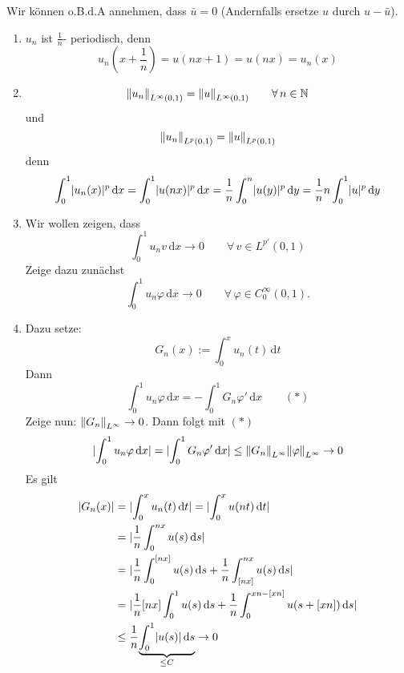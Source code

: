 \begin{beweis}[Für $p >1$]
	Wir können o.B.d.A annehmen, dass $\bar{u}=0$ (Andernfalls ersetze $u$ durch $u-\bar{u}$).
	\begin{enumerate}[(1)]
		\item $u_n$ ist $\frac{1}{n}$- periodisch, denn
		\[
			u_n(x+\frac{1}{n})= u(nx+1) = u(nx) = u_n(x)
		\]
		\item \[
			\norm{u_n}_{L^{\infty}(0,1)} = \norm{u}_{L^{\infty}(0,1)} \qquad \forall\, n \in \mathbb{N}
		\]und 
		\[
			\norm{u_n}_{L^p(0,1)} = \norm{u}_{L^p(0,1)}
		\] denn
		\[
			\int_{0}^{1} \lvert u_n(x)\rvert^p \,\mathrm{d}x = \int_{0}^{1} \lvert u(nx)\rvert^p \,\mathrm{d}x = \frac{1}{n} \int_{0}^{n} \lvert u(y)\rvert^p \,\mathrm{d}y  
		= \frac{1}{n}n \int_{0}^{1}\lvert u\rvert^p \,\mathrm{d}y
		\]
		\item Wir wollen zeigen, dass 
		\[
			\int_{0}^{1}u_n v \,\mathrm{d}x \to 0 \qquad \forall\, v \in L^{p'}(0,1)
		\]
		Zeige dazu zunächst
		\[
			\int_{0}^{1}u_n \varphi \,\mathrm{d}x \to 0 \qquad \forall\, \varphi \in C_0^{\infty}(0,1).
		\]
		\item Dazu setze:
		\[
			G_n(x) := \int_{0}^{x}u_n(t) \,\mathrm{d}t
		\]
		Dann
		\[
			\int_{0}^{1}u_n \varphi \,\mathrm{d}x = - \int_{0}^{1} G_n \varphi' \,\mathrm{d}x \qquad (*)
		\]
		Zeige nun: $\norm{G_n}_{L^{\infty}} \to 0$. Dann folgt mit $(*)$
		\[
			\abs{\int_{0}^{1} u_n \varphi \,\mathrm{d}x} = \abs{\int_{0}^{1} G_n \varphi' \,\mathrm{d}x } \leq \norm{G_n}_{L^{\infty}} \norm{\varphi}_{L^{\infty}} \to 0
		\]
		Es gilt
		\begin{align*}
			\lvert G_n(x)\rvert &= \lvert\int_{0}^{x}u_n(t) \,\mathrm{d}t\rvert = \lvert\int_{0}^{x} u(nt) \,\mathrm{d}t\rvert \\
			&= \lvert\frac{1}{n} \int_{0}^{nx} u(s) \,\mathrm{d}s\rvert \\
			&= \lvert \frac{1}{n} \int_{0}^{[nx]} u(s) \,\mathrm{d}s + \frac{1}{n} \int_{[nx]}^{nx} u(s) \,\mathrm{d}s\rvert \\
			&= \lvert\frac{1}{n} [nx] \int_{0}^{1} u(s) \,\mathrm{d}s + \frac{1}{n} \int_{0}^{xn -[xn]} u(s+ [xn]) \,\mathrm{d}s\rvert \\
			&\leq \frac{1}{n} \underset{\leq C}{\underbrace{\int_{0}^{1} \lvert u(s)\rvert \,\mathrm{d}s}} \to 0
		\end{align*}
	\end{enumerate}
\end{beweis}
\cleardoubleoddemptypage
{}
\setcounter{page}{1}

